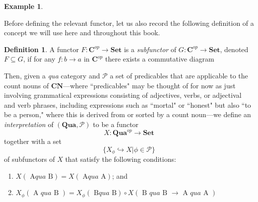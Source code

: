 \documentclass[a4paper]{book}
\theoremstyle{definition}
\newtheorem{example}{Example}[section]
\theoremstyle{definition}
\newtheorem{definition}{Definition}[section]
\theoremstyle{definition}
\theoremstyle{theorem}
\theoremstyle{definition}
\begin{document}
\begin{example}
	\begin{center}
	\end{center}
Before defining the relevant functor, let us also record the following definition of a concept we will use here and throughout this book. 
\begin{definition}
	A functor $F: \textbf{C}^{op} \rightarrow \textbf{Set}$ is a \textit{subfunctor}  of $G: \textbf{C}^{op} \rightarrow \textbf{Set}$, denoted $F \subseteq  G$, if for any $f: b \rightarrow a$ in $\textbf{C}^{op}$ there exists a commutative diagram 
	\begin{center}
	\end{center} 
\end{definition}
	\noindent 
Then, given a \textit{qua} category and $\mathscr{P}$ a set of predicables that are applicable to the count nouns of $\textbf{CN}$---where ``predicables" may be thought of for now as just involving grammatical expressions consisting of adjectives, verbs, or adjectival and verb phrases, including expressions such as ``mortal" or ``honest" but also ``to be a person," where this is derived from or sorted by a count noun---we define an \textit{interpretation} of $(\textbf{Qua}, \mathscr{P})$ to be a functor 
		\begin{equation}
		X: \textbf{Qua}^{op} \rightarrow \textbf{Set}
		\end{equation}
		together with a set 
		\begin{equation}
		\{X_{\phi} \hookrightarrow X | \phi \in \mathscr{P}\}
		\end{equation}
		of subfunctors of $X$ that satisfy the following conditions: 
		\begin{enumerate}
			\item $X(\boxed{\text{ A}}qua \boxed{\text{ B}}) = X(\boxed{\text{ A}}qua \boxed{\text{ A}})$; and 
			\item $X_{\phi}(\boxed{\text{ A }}qua \boxed{\text{ B }}) = X_{\phi}(\boxed{\text{ B}}qua \boxed{\text{ B}}) \circ X(\boxed{\text{ B }}qua\boxed{\text{ B }} \rightarrow \boxed{\text{ A }}qua\boxed{\text{ A }})$

\end{enumerate}
\end{example}
\end{document}
